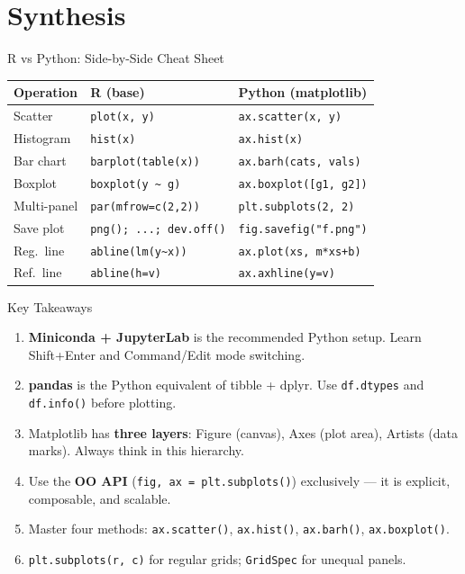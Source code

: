 \documentclass[10pt]{beamer}
\begin{document}
\section{Synthesis}

\begin{frame}{R vs Python: Side-by-Side Cheat Sheet}
  \centering
  {\small
  \begin{tabular}{lll}
    \toprule
    \textbf{Operation} & \textbf{R (base)} & \textbf{Python (matplotlib)} \\
    \midrule
    Scatter   & \texttt{plot(x, y)}             & \texttt{ax.scatter(x, y)} \\
    Histogram & \texttt{hist(x)}                & \texttt{ax.hist(x)} \\
    Bar chart & \texttt{barplot(table(x))}      & \texttt{ax.barh(cats, vals)} \\
    Boxplot   & \texttt{boxplot(y \textasciitilde{} g)} & \texttt{ax.boxplot([g1, g2])} \\
    Multi-panel & \texttt{par(mfrow=c(2,2))}    & \texttt{plt.subplots(2, 2)} \\
    Save plot & \texttt{png(); ...; dev.off()}  & \texttt{fig.savefig("f.png")} \\
    Reg.\ line & \texttt{abline(lm(y\textasciitilde{}x))} & \texttt{ax.plot(xs, m*xs+b)} \\
    Ref.\ line & \texttt{abline(h=v)}           & \texttt{ax.axhline(y=v)} \\
    \bottomrule
  \end{tabular}}
\end{frame}

\begin{frame}{Key Takeaways}
  \begin{enumerate}
    \item \textbf{Miniconda + JupyterLab} is the recommended Python
          setup. Learn Shift+Enter and Command/Edit mode switching.
    \item \textbf{pandas} is the Python equivalent of tibble + dplyr.
          Use \texttt{df.dtypes} and \texttt{df.info()} before plotting.
    \item Matplotlib has \textbf{three layers}: Figure (canvas), Axes
          (plot area), Artists (data marks). Always think in this hierarchy.
    \item Use the \textbf{OO API} (\texttt{fig, ax = plt.subplots()})
          exclusively --- it is explicit, composable, and scalable.
    \item Master four methods: \texttt{ax.scatter()}, \texttt{ax.hist()},
          \texttt{ax.barh()}, \texttt{ax.boxplot()}.
    \item \texttt{plt.subplots(r, c)} for regular grids;
          \texttt{GridSpec} for unequal panels.
  \end{enumerate}
\end{frame}
\end{document}
